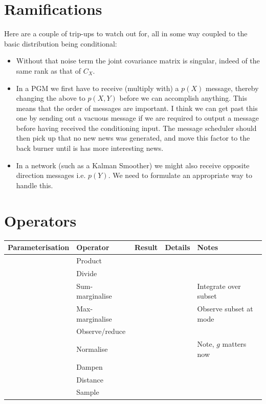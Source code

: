 \documentclass[oneside,english]{scrbook}
\begin{document}
\section{Ramifications}
Here are a couple of trip-ups to watch out for, all in some way
coupled to the basic distribution being conditional:
\begin{itemize}
\item Without that noise term the joint covariance matrix is singular,
  indeed of the same rank as that of $C_X$.
\item In a PGM we first have to receive (multiply with) a $p(X)$
  message, thereby changing the above to $p(X,Y)$ before we can
  accomplish anything. This means that the order of messages are
  important. I think we can get past this one by sending out a vacuous
  message if we are required to output a message before having
  received the conditioning input. The message scheduler should then
  pick up that no new news was generated, and move this factor to the
  back burner until is has more interesting news.
\item In a network (such as a Kalman Smoother) we might also receive
  opposite direction messages i.e. $p(Y)$. We need to formulate an
  appropriate way to handle this.
\end{itemize}

\section{Operators}

\begin{tabular}{lllll}
  Parameterisation         & Operator             & Result                   & Details & Notes\\ \hline
                           & Product              &                          &         & \parbox{0.3\textwidth}{}\\
                           & Divide               &                          &         & \parbox{0.3\textwidth}{}\\
                           & Sum-marginalise      &                          &         & \parbox{0.3\textwidth}{Integrate over subset}\\
                           & Max-marginalise      &                          &         & \parbox{0.3\textwidth}{Observe subset at mode}\\
                           & Observe/reduce       &                          &         & \parbox{0.3\textwidth}{}\\
                           & Normalise            &                          &         & \parbox{0.3\textwidth}{Note, $g$ matters now}\\
                           & Dampen               &                          &         & \parbox{0.3\textwidth}{}\\
                           & Distance             &                          &         & \parbox{0.3\textwidth}{}\\
                           & Sample               &                          &         & \parbox{0.3\textwidth}{}\\
\end{tabular}
\end{document}

